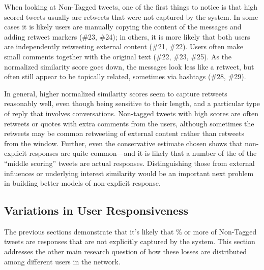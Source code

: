 When looking at Non-Tagged tweets, one of the first things to notice is that high scored tweets usually are retweets that were not captured by the system.  In some cases it is likely users are manually copying the content of the messages and adding retweet markers (\#23, \#24); in others, it is more likely that both users are independently retweeting external content (\#21, \#22).  Users often make small comments together with the original text (\#22, \#23, \#25).  As the normalized similarity score goes down, the messages look less like a retweet, but often still appear to be topically related, sometimes via hashtags (\#28, \#29).  

In general, higher normalized similarity scores seem to capture retweets reasonably well, even though being sensitive to their length, and a particular type of reply that involves conversations.  Non-tagged tweets with high scores are often retweets or quotes with extra comments from the users, although sometimes the retweets may be common retweeting of external content rather than retweets from the window.
Further, even the conservative estimate chosen shows that non-explicit responses are quite common---and it is likely that a number of the of the ``middle scoring'' tweets are actual responses.  Distinguishing those from external influences or underlying interest similarity would be an important next problem in building better models of non-explicit response.  

\subsection{Variations in User Responsiveness}

The previous sections demonstrate that it's likely that \highNonTaggedTweetCountPct{}\% or more of Non-Tagged tweets are responses that are not explicitly captured by the system.  This section addresses the other main research question of how these losses are distributed among different users in the network.   

